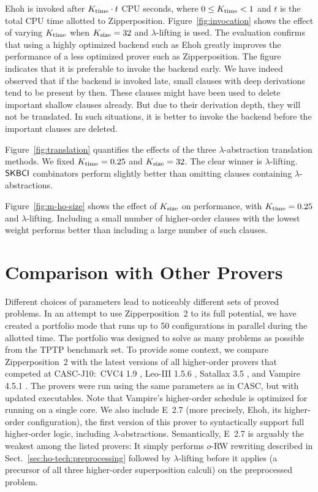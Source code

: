\documentclass[smallcondensed,draft]{svjour3}     %
\begin{document}
  Ehoh is invoked after $ K_\mathrm{time} \cdot t $ CPU seconds, where $0 \le K_\mathrm{time} < 1$ and $t$
  is the total CPU time allotted to Zipperposition. Figure~\ref{fig:invocation}
  shows the effect of varying $K_\mathrm{time}$ when $K_\mathrm{size} = 32$
  and $\lambda$-lifting is used. The evaluation confirms that using a highly
  optimized backend such as Ehoh greatly improves the performance of a
  less optimized prover such as Zipperposition.
  The figure indicates that it is preferable to invoke the backend early. We
  have indeed observed that if the backend is invoked late, small clauses with
  deep derivations tend to be present by then. These clauses might have been
  used to delete important shallow clauses already. But due to their derivation
  depth, they will not be translated. In such situations, it is better to
  invoke the backend before the important clauses are deleted.

  Figure~\ref{fig:translation} quantifies the effects of the three
  $\lambda$-abstraction translation methods. We fixed $K_\mathrm{time} = 0.25$ and
  $K_\mathrm{size}=32$. The clear winner is $\lambda$-lifting.
  $\mathsf{SKBCI}$ combinators perform slightly better than omitting clauses
  containing $\lambda$-abstractions.

  Figure~\ref{fig:m-ho-size} shows the effect of $K_\mathrm{size}$ on
  performance, with $K_\mathrm{time} = 0.25$ and $\lambda$-lifting. Including a
  small number of higher-order clauses with the lowest weight performs better
  than including a large number of such clauses.

\section{Comparison with Other Provers}
\label{sec:ho-tech:comparison}

Different choices of
parameters lead to noticeably different sets of proved problems. In an attempt
to use Zipperposition~2 to its full potential, we have created a portfolio mode
that runs up to 50 configurations in parallel during the allotted time. The portfolio
was designed to solve as many problems as possible from the TPTP benchmark set. To
provide some context, we compare Zipperposition~2 with the latest versions of
all higher-order provers that competed at CASC-J10:\ CVC4 1.9
\cite{cbetal-11-cvc4}, Leo-III 1.5.6 \cite{sb-21-leo3}, Satallax 3.5
\cite{cb-2013-satallax}, and Vampire 4.5.1 \cite{br-20-full-sup-w-combs}.
The provers were run using the same parameters as in CASC, but with updated
executables.
Note that
Vampire's higher-order schedule is optimized for running on a single core.
We also include E~2.7 (more precisely, Ehoh, its higher-order configuration), the first version of this prover to syntactically support
full higher-order logic, including $\lambda$-abstractions.
Semantically, E~2.7 is arguably the weakest among the listed provers:
It simply performs $o$-RW rewriting described in Sect.~\ref{sec:ho-tech:preprocessing} followed by
$\lambda$-lifting before it applies  \cite{bbcw-21-lfho}
(a precursor of all three higher-order superposition calculi) on the preprocessed problem.
\end{document}
